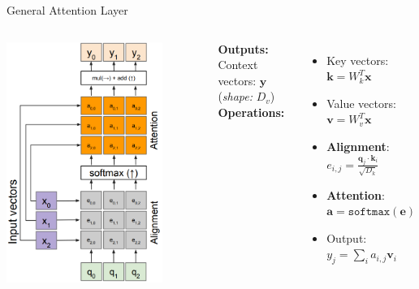 \documentclass[serif, aspectratio=169]{beamer}
\begin{document}
\begin{frame}{General Attention Layer}
	\begin{columns}
		
		\includegraphics[width=0.8\textwidth]{pic/General-Attention-Layer.png}
		
		\textbf{Outputs:} \\
		Context vectors: $\mathbf{y}$ (\textit{shape: } $D_v$) \\[1em]
		
		\textbf{Operations:}
		\begin{itemize}
			\item Key vectors: $\mathbf{k} = W_k^T \mathbf{x}$
			\item Value vectors: $\mathbf{v} = W_v^T \mathbf{x}$
			\item \textbf{Alignment}: $e_{i,j} = \frac{\mathbf{q}_j \cdot \mathbf{k}_i}{\sqrt{D_k}}$
			\item \textbf{Attention}: $\mathbf{a} = \texttt{softmax}(\mathbf{e})$
			\item Output: $y_j = \sum_i a_{i,j} \mathbf{v}_i$
		\end{itemize}
		

\end{columns}
\end{frame}
\end{document}
